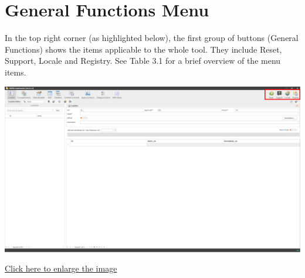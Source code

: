\documentclass[
]{book}
\begin{document}
\hypertarget{general-functions-menu}{%
\section{General Functions Menu}\label{general-functions-menu}}

In the top right corner (as highlighted below), the first group of buttons (General Functions) shows the items applicable to the whole tool. They include Reset, Support, Locale and Registry. See Table 3.1 for a brief overview of the menu items.

\begin{center}\includegraphics[width=1\linewidth]{./images/image011} \end{center}

\href{images/image011.png}{Click here to enlarge the image}
\end{document}
